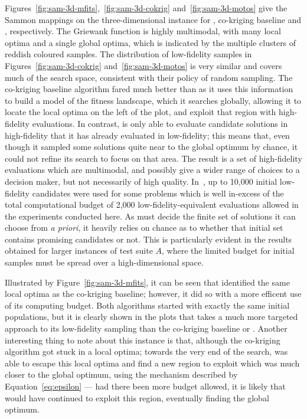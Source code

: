 Figures~\ref{fig:sam-3d-mfits},~\ref{fig:sam-3d-cokrig} and~\ref{fig:sam-3d-motos} give the Sammon mappings on the three-dimensional instance for \AlgName{}, co-kriging baseline and \motos{}, respectively. The Griewank function is highly multimodal, with many local optima and a single global optima, which is indicated by the multiple clusters of reddish coloured samples. The distribution of low-fidelity samples in Figures~\ref{fig:sam-3d-cokrig} and~\ref{fig:sam-3d-motos} is very similar and covers much of the search space, consistent with their policy of random sampling. The co-kriging baseline algorithm fared much better than \motos{} as it uses this information to build a model of the fitness landscape, which it searches globally, allowing it to locate the local optima on the left of the plot, and exploit that region with high-fidelity evaluations. In contrast, \motos{} is only able to evaluate candidate solutions in high-fidelity that it has already evaluated in low-fidelity; this means that, even though it sampled some solutions quite near to the global optimum by chance, it could not refine its search to focus on that area. The result is a set of high-fidelity evaluations which are multimodal, and possibly give a wider range of choices to a decision maker, but not necessarily of high quality. In~\cite{xu2016mo2tos}, up to 10,000 initial low-fidelity candidates were used for some problems which is well in-excess of the total computational budget of 2,000 low-fidelity-equivalent evaluations allowed in the experiments conducted here. As \motos{} must decide the finite set of solutions it can choose from \emph{a priori}, it heavily relies on chance as to whether that initial set contains promising candidates or not. This is particularly evident in the results obtained for larger instances of test suite $A$, where the limited budget for initial samples must be spread over a high-dimensional space.

Illustrated by Figure~\ref{fig:sam-3d-mfits}, it can be seen that \AlgName{} identified the same local optima as the co-kriging baseline; however, it did so with a more efficent use of its computing budget. Both algorithms started with exactly the same initial populations, but it is clearly shown in the plots that \AlgName{} takes a much more targeted approach to its low-fidelity sampling than the co-kriging baseline or \motos{}. Another interesting thing to note about this instance is that, although the co-kriging algorithm got stuck in a local optima; towards the very end of the search, \AlgName{} was able to escape this local optima and find a new region to exploit which was much closer to the global optimum, using the mechanism described by Equation~\ref{eq:epsilon} --- had there been more budget allowed, it is likely that \AlgName{} would have continued to exploit this region, eventually finding the global optimum. 

